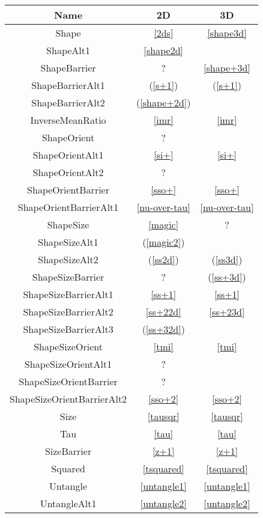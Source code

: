 \documentclass{report}
\begin{document}
\begin{tabular}{|c|c|c|}
\hline
Name & 2D & 3D \\
\hline
Shape & \ref{2ds} & \ref{shape3d} \\
ShapeAlt1 & \ref{shape2d} &  \\
\hline
ShapeBarrier & ? & \ref{shape+3d} \\
ShapeBarrierAlt1 & (\ref{s+1}) & (\ref{s+1}) \\
ShapeBarrierAlt2 & (\ref{shape+2d}) &  \\
InverseMeanRatio & \ref{imr} & \ref{imr} \\
\hline
ShapeOrient & ? &  \\
ShapeOrientAlt1 & \ref{si+} & \ref{si+} \\
ShapeOrientAlt2 & ? &  \\
\hline
ShapeOrientBarrier & \ref{sso+} & \ref{sso+} \\
ShapeOrientBarrierAlt1 & \ref{nu-over-tau} & \ref{nu-over-tau} \\
\hline
ShapeSize & \ref{magic} & ? \\
ShapeSizeAlt1 & (\ref{magic2}) &  \\
ShapeSizeAlt2 & (\ref{ss2d}) & (\ref{ss3d}) \\
\hline
ShapeSizeBarrier & ? & (\ref{ss+3d}) \\
ShapeSizeBarrierAlt1 & \ref{ss+1} & \ref{ss+1} \\
ShapeSizeBarrierAlt2 & \ref{ss+22d} & \ref{ss+23d} \\
ShapeSizeBarrierAlt3 & (\ref{ss+32d}) &  \\
\hline
ShapeSizeOrient & \ref{tmi} & \ref{tmi} \\
ShapeSizeOrientAlt1 & ? &  \\
\hline
ShapeSizeOrientBarrier & ? & \\
ShapeSizeOrientBarrierAlt2 & \ref{sso+2} & \ref{sso+2} \\
\hline
Size & \ref{tausqr} & \ref{tausqr} \\
Tau & \ref{tau} & \ref{tau} \\
\hline
SizeBarrier & \ref{z+1} & \ref{z+1} \\
\hline
Squared & \ref{tsquared} & \ref{tsquared} \\
\hline
Untangle & \ref{untangle1} & \ref{untangle1} \\
UntangleAlt1 & \ref{untangle2} & \ref{untangle2} \\
\hline
\end{tabular}
\end{document}
